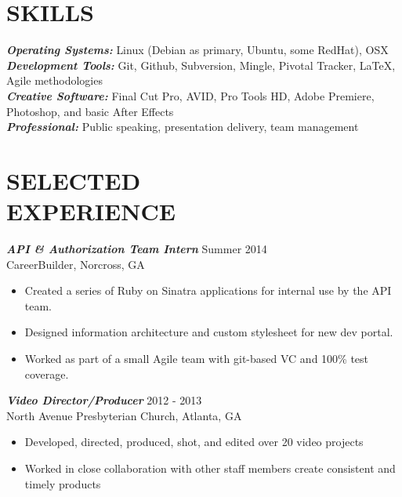 \documentclass[margin]{res}
\begin{document}
\begin{resume}
\section{SKILLS} 
                {\sl \textbf{Operating Systems: }} Linux (Debian as primary, Ubuntu, some RedHat), OSX\\
                {\sl \textbf{Development Tools: }} Git, Github, Subversion, Mingle, Pivotal Tracker, \LaTeX, Agile methodologies \\
                {\sl \textbf{Creative Software: }} Final Cut Pro, AVID, Pro Tools HD, Adobe Premiere,\\Photoshop, and basic After Effects\\
                {\sl \textbf{Professional: }} Public speaking, presentation delivery, team management
                 
\section{SELECTED \\ EXPERIENCE}    
                {\sl \textbf{API \& Authorization Team Intern}} \hfill Summer 2014 \\
                    CareerBuilder, Norcross, GA
                 \begin{itemize}  \itemsep -2pt %
                 \item Created a series of Ruby on Sinatra applications for internal use by the API team.
                 \item Designed information architecture and custom stylesheet for new dev portal.
                 \item Worked as part of a small Agile team with git-based VC and 100\% test coverage.
                \end{itemize}

                {\sl \textbf{Video Director/Producer}} \hfill            2012 - 2013 \\
                 North Avenue Presbyterian Church, Atlanta, GA
                 \begin{itemize}  \itemsep -2pt %
                 \item Developed, directed, produced, shot, and edited over 20 video projects
                 \item Worked in close collaboration with other staff members create consistent and timely products
                 \end{itemize} 


\end{resume}
\end{document}
